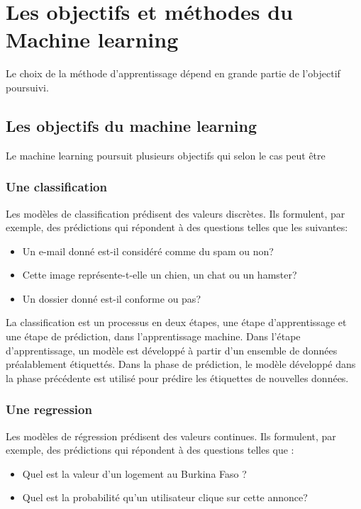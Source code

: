 \section{Les objectifs et méthodes du Machine learning}

Le choix de la méthode d'apprentissage dépend en grande partie de l'objectif
poursuivi.

\subsection{Les objectifs du machine learning}

Le machine learning poursuit plusieurs objectifs qui selon le cas peut être
 \subsubsection{Une classification}
Les modèles de classification prédisent des valeurs discrètes. Ils formulent, 
par exemple, des prédictions qui répondent à des questions telles que les suivantes:
\begin{itemize}
  \item Un e-mail donné est-il considéré comme du spam ou non?
  \item Cette image représente-t-elle un chien, un chat ou un hamster?
  \item Un dossier donné est-il conforme ou pas?
\end{itemize}

La classification est un processus en deux étapes, une étape 
d’apprentissage et une étape de prédiction, dans l’apprentissage machine.
Dans l’étape d’apprentissage, un modèle est développé à partir d’un 
ensemble de données préalablement étiquettés. Dans la phase de prédiction,
le modèle développé dans la phase précédente est utilisé pour prédire les 
étiquettes de nouvelles données.

\subsubsection{Une regression}
Les modèles de régression prédisent des valeurs continues. Ils formulent,
par exemple, des prédictions qui répondent à des questions telles que :
\begin{itemize}
  \item Quel est la valeur d'un logement au Burkina Faso ?
  \item Quel est la probabilité qu'un utilisateur clique sur cette annonce?
\end{itemize}

